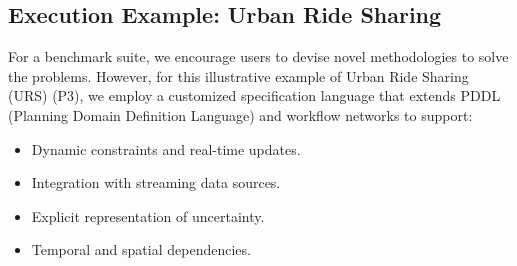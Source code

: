 \subsection{Execution Example: Urban Ride Sharing }

For a benchmark suite, we encourage users to
devise novel methodologies to solve the problems. However, for this illustrative example of Urban Ride Sharing (URS) (P3), we employ a customized specification language that extends PDDL (Planning Domain Definition Language) and workflow networks to support:

\begin{itemize}[leftmargin=1.0em, topsep=-.0em, parsep=-.0em, label=-]
    \item Dynamic constraints and real-time updates.
    \item Integration with streaming data sources.
    \item Explicit representation of uncertainty.
    \item Temporal and spatial dependencies.
\end{itemize}

